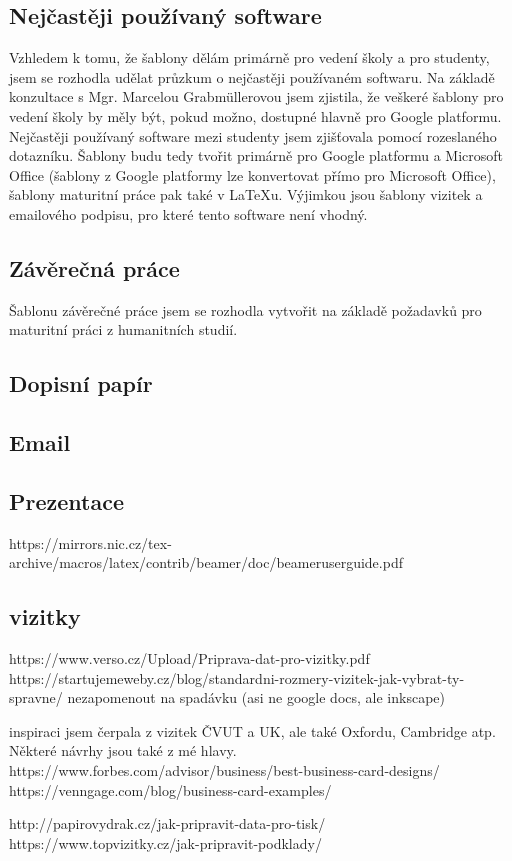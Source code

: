 \documentclass[11pt,a4paper,twoside,openright]{report}
\begin{document}
\subsection{Nejčastěji používaný software}
Vzhledem k tomu, že šablony dělám primárně pro vedení školy a pro studenty, jsem se rozhodla udělat průzkum o nejčastěji používaném softwaru. Na základě konzultace s Mgr. Marcelou Grabmüllerovou jsem zjistila, že veškeré šablony pro vedení školy by měly být, pokud možno, dostupné hlavně pro Google platformu. Nejčastěji používaný software mezi studenty jsem zjišťovala pomocí rozeslaného dotazníku.
Šablony budu tedy tvořit primárně pro Google platformu a Microsoft Office (šablony z Google platformy lze konvertovat přímo pro Microsoft Office), šablony maturitní práce pak také v LaTeXu. Výjimkou jsou šablony vizitek a emailového podpisu, pro které tento software není vhodný.
\subsection{Závěrečná práce}
Šablonu závěrečné práce jsem se rozhodla vytvořit na základě požadavků pro maturitní práci z humanitních studií.
\subsection{Dopisní papír}
\subsection{Email}
\subsection{Prezentace}
https://mirrors.nic.cz/tex-archive/macros/latex/contrib/beamer/doc/beameruserguide.pdf
\subsection{vizitky}
https://www.verso.cz/Upload/Priprava-dat-pro-vizitky.pdf
https://startujemeweby.cz/blog/standardni-rozmery-vizitek-jak-vybrat-ty-spravne/
nezapomenout na spadávku (asi ne google docs, ale inkscape)

inspiraci jsem čerpala z vizitek ČVUT a UK, ale také Oxfordu, Cambridge atp. Některé návrhy jsou také z mé hlavy.
https://www.forbes.com/advisor/business/best-business-card-designs/
https://venngage.com/blog/business-card-examples/

http://papirovydrak.cz/jak-pripravit-data-pro-tisk/
https://www.topvizitky.cz/jak-pripravit-podklady/
\end{document}

